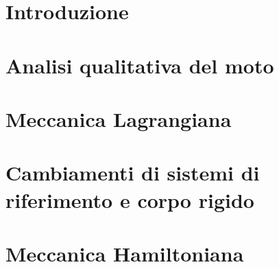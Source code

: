 \documentclass[10pt,a4paper,twoside,headinclude,footinclude,color]{./latex-notes-cls/edoars-notes}
\begin{document}

\tableofcontents

\part{Introduzione}


\part{Analisi qualitativa del moto}



\part{Meccanica Lagrangiana}



\part{Cambiamenti di sistemi di riferimento e corpo rigido}


\part{Meccanica Hamiltoniana}



\printindex
\end{document}
